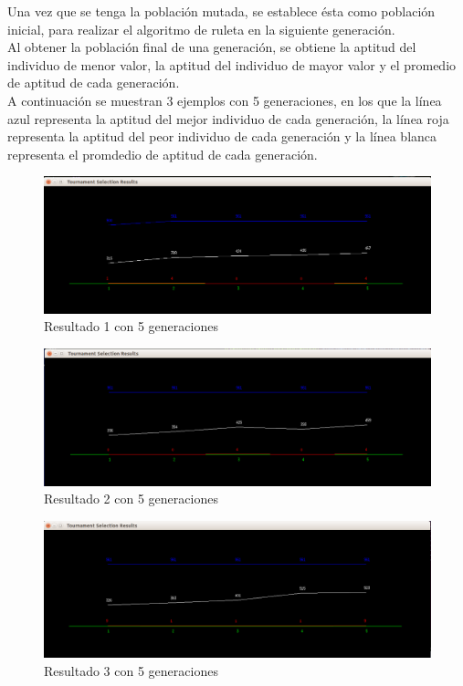 \documentclass[11pt,letterpaper]{article}
\begin{document}
Una vez que se tenga la población mutada, se establece ésta como población inicial, para realizar el algoritmo de ruleta en la siguiente generación.\\

Al obtener la población final de una generación, se obtiene la aptitud del individuo de menor valor, la aptitud del individuo de mayor valor y el promedio de aptitud de cada generación.\\

A continuación se muestran 3 ejemplos con 5 generaciones, en los que la línea azul representa la aptitud del mejor individuo de cada generación, la línea roja representa la aptitud del peor individuo de cada generación y la línea blanca representa el promdedio de aptitud de cada generación.
\begin{figure}[H]
	\centering
	\includegraphics[scale = 0.4]{images/5gen1}
	\caption{Resultado 1 con 5 generaciones}
\end{figure}

\begin{figure}[H]
	\centering
	\includegraphics[scale = 0.4]{images/5gen2}
	\caption{Resultado 2 con 5 generaciones}
\end{figure}

\begin{figure}[H]
	\centering
	\includegraphics[scale = 0.4]{images/5gen3}
	\caption{Resultado 3 con 5 generaciones}
\end{figure}
\end{document}
